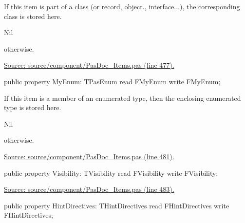 \documentclass{report}
\newif\ifpdf
\begin{document}
\begin{list}{}
\begin{flushleft}
\ifpdf
\end{flushleft}
\fi


\par If this item is part of a class (or record, object., interface...), the corresponding class is stored here. \begin{ttfamily}Nil\end{ttfamily} otherwise.\par
\href{https://github.com/pasdoc/pasdoc/blob/master/source/component/PasDoc_Items.pas#L477}{Source: source/component/PasDoc{\_}Items.pas (line 477).}\label{PasDoc_Items.TPasItem-MyEnum}
\item[\textbf{MyEnum}\hfill]
\ifpdf
\begin{flushleft}
\fi
\begin{ttfamily}
public property MyEnum: TPasEnum read FMyEnum write FMyEnum;\end{ttfamily}

\ifpdf
\end{flushleft}
\fi


\par If this item is a member of an enumerated type, then the enclosing enumerated type is stored here. \begin{ttfamily}Nil\end{ttfamily} otherwise.\par
\href{https://github.com/pasdoc/pasdoc/blob/master/source/component/PasDoc_Items.pas#L481}{Source: source/component/PasDoc{\_}Items.pas (line 481).}\label{PasDoc_Items.TPasItem-Visibility}
\item[\textbf{Visibility}\hfill]
\ifpdf
\begin{flushleft}
\fi
\begin{ttfamily}
public property Visibility: TVisibility read FVisibility write FVisibility;\end{ttfamily}

\ifpdf
\end{flushleft}
\fi


\par  \par
\href{https://github.com/pasdoc/pasdoc/blob/master/source/component/PasDoc_Items.pas#L483}{Source: source/component/PasDoc{\_}Items.pas (line 483).}\label{PasDoc_Items.TPasItem-HintDirectives}
\item[\textbf{HintDirectives}\hfill]
\ifpdf
\begin{flushleft}
\fi
\begin{ttfamily}
public property HintDirectives: THintDirectives read FHintDirectives write FHintDirectives;\end{ttfamily}


\end{flushleft}
\end{list}
\end{document}
